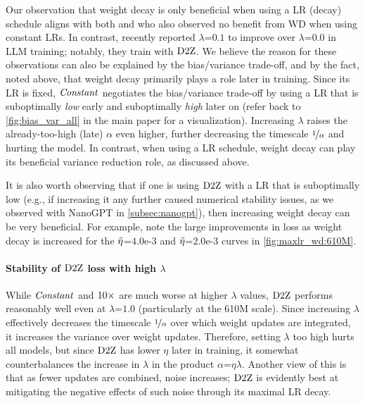 Our observation that weight decay is only beneficial when using a LR
(decay) schedule aligns with both \citet{loshchilov2017decoupled} and
\citet{andriushchenko2023why} who also observed no benefit from WD
when using constant LRs.
%
In contrast, \citet{alephalpha2024introducing} recently reported
$\lambda$=$0.1$ to improve over $\lambda$=$0.0$ in LLM training;
notably, they train with $\mbox{D2Z}$.
%
We believe the reason for these observations can also be explained by
the bias/variance trade-off, and by the fact, noted above, that weight
decay primarily plays a role later in training.
%
Since its LR is fixed, $\mbox{\emph{Constant}}$ negotiates the bias/variance
trade-off by using a LR that is suboptimally \emph{low} early and
suboptimally \emph{high} later on (refer back to
\cref{fig:bias_var_all} in the main paper for a visualization).
Increasing $\lambda$ raises the already-too-high (late) $\alpha$ even
higher, further decreasing the timescale $\nicefrac{1}{\alpha}$ and
hurting the model.
%
In contrast, when using a LR schedule, weight decay can play its
beneficial variance reduction role, as discussed above.

It is also worth observing that if one is using $\mbox{D2Z}$ with a LR that
is suboptimally low (e.g., if increasing it any further caused
numerical stability issues, as we observed with NanoGPT in
\cref{subsec:nanogpt}), then increasing weight decay can be very
beneficial.  For example, note the large improvements in loss as
weight decay is increased for the $\tilde{\eta}$=$4.0$e-$3$ and
$\tilde{\eta}$=$2.0$e-$3$ curves in \cref{fig:maxlr_wd:610M}.

\paragraph{Stability of $\mbox{D2Z}$ loss with high $\lambda$}

%
While $\mbox{\emph{Constant}}$ and $\mbox{10}\times$ are much worse at higher $\lambda$
values, $\mbox{D2Z}$ performs reasonably well even at $\lambda$=$1.0$
(particularly at the 610M scale).  Since increasing $\lambda$
effectively decreases the timescale $\nicefrac{1}{\alpha}$ over which
weight updates are integrated, it increases the variance over weight
updates.  Therefore, setting $\lambda$ too high hurts all models, but
since $\mbox{D2Z}$ has lower $\eta$ later in training, it somewhat
counterbalances the increase in $\lambda$ in the product
$\alpha$=$\eta\lambda$.  Another view of this is that as fewer updates
are combined, noise increases; $\mbox{D2Z}$ is evidently best at mitigating
the negative effects of such noise through its maximal LR decay.

